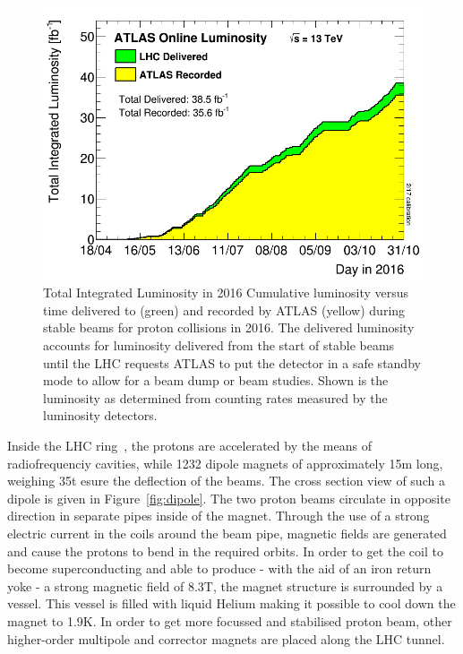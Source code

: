 \begin{figure}[ht]
\begin{minipage}[b]{0.4\textwidth}
\includegraphics[width=\textwidth]{2_ExperimentalSetup/Figures/sumLumiByDay}
	\caption{Total Integrated Luminosity in 2016 
		Cumulative luminosity versus time delivered to (green) and recorded by ATLAS (yellow) during stable beams for proton collisions  in 2016. The delivered luminosity accounts for luminosity delivered from the start of stable beams until the LHC requests ATLAS to put the detector in a safe standby mode to allow for a beam dump or beam studies. Shown is the luminosity as determined from counting rates measured by the luminosity detectors. }
	\end{minipage}
	\label{fig:IntLumi}
\end{figure}

 
Inside the LHC ring~\cite{Bruning:782076}, the protons are accelerated by the means of radiofrequenciy cavities, while 1232 dipole magnets of approximately 15\si{ \m} long, weighing 35\si{ \tonne} esure the deflection of the beams. The cross section view of such a dipole is given in Figure~\ref{fig:dipole}. The two proton beams circulate in opposite direction in separate pipes inside of the magnet. Through the use of a strong electric current in the coils around the beam pipe, magnetic fields are generated and cause the protons to bend in the required orbits. In order to get the coil to become superconducting and able to produce - with the aid of an iron return yoke - a strong magnetic field of 8.3\si{ \tesla}, the magnet structure is surrounded by a vessel. This vessel is filled with liquid Helium making it possible to cool down the magnet to 1.9\si{ \kelvin}. In order to get more focussed and stabilised proton beam, other higher-order multipole and corrector magnets are placed along the LHC tunnel.

